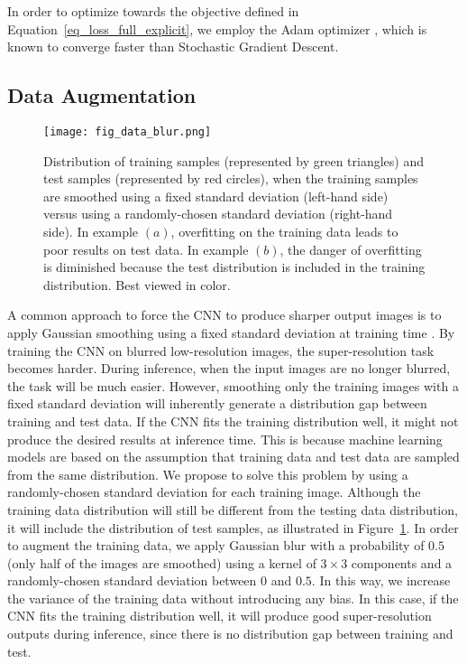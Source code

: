 \documentclass{ieeeaccess}
\begin{document}
In order to optimize towards the objective defined in Equation~\eqref{eq_loss_full_explicit}, we employ the Adam optimizer \cite{Kingma-ICLR-2015}, which is known to converge faster than Stochastic Gradient Descent.

\subsection{Data Augmentation}

\begin{figure}[t!]
\centering
\texttt{[image: fig\_data\_blur.png]}
\caption{Distribution of training samples (represented by green triangles) and test samples (represented by red circles), when the training samples are smoothed using a fixed standard deviation (left-hand side) versus using a randomly-chosen standard deviation (right-hand side). In example $(a)$, overfitting on the training data leads to poor results on test data. In example $(b)$, the danger of overfitting is diminished because the test distribution is included in the training distribution. Best viewed in color.}
\label{fig_data_blur}
\end{figure}

A common approach to force the CNN to produce sharper output images is to apply Gaussian smoothing using a fixed standard deviation at training time \cite{Du-AS-2019, Shi-JBHI-2018, ZENG-CBM-2018}. By training the CNN on blurred low-resolution images, the super-resolution task becomes harder. During inference, when the input images are no longer blurred, the task will be much easier. However, smoothing only the training images with a fixed standard deviation will inherently generate a distribution gap between training and test data. If the CNN fits the training distribution well, it might not produce the desired results at inference time. This is because machine learning models are based on the assumption that training data and test data are sampled from the same distribution. We propose to solve this problem by using a randomly-chosen standard deviation for each training image. Although the training data distribution will still be different from the testing data distribution, it will include the distribution of test samples, as illustrated in Figure~\ref{fig_data_blur}.  In order to augment the training data, we apply Gaussian blur with a probability of $0.5$ (only half of the images are smoothed) using a kernel of $3 \times 3$ components and a randomly-chosen standard deviation between $0$ and $0.5$. In this way, we increase the variance of the training data without introducing any bias. In this case, if the CNN fits the training distribution well, it will produce good super-resolution outputs during inference, since there is no distribution gap between training and test.
\end{document}
